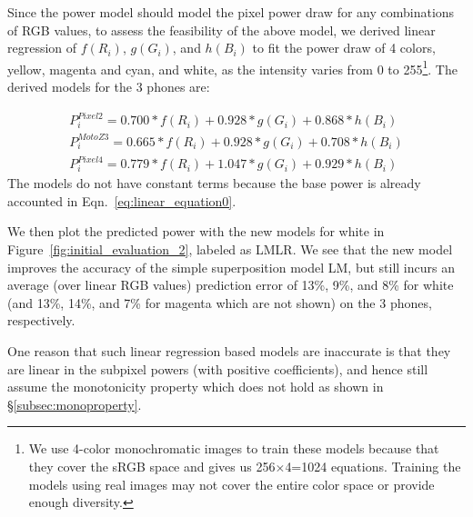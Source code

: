 
Since the power model should model the pixel power draw for
any combinations of RGB values, to assess the feasibility of the above model, we 
derived linear regression of $f(R_{i})$, $g(G_{i})$, and $h(B_{i})$ 
to fit the power draw of 4 colors, yellow, magenta and cyan, and white,
as the intensity varies from 0 to 255\footnote{We use 4-color monochromatic images to train these
  models because that they cover the sRGB space and gives us 256$\times$4=1024 equations.
  Training the models using real images may not cover the entire color space or provide
  enough diversity.}. The derived models
for the 3 phones are:

\vspace{-0.1in}
{\small
  \begin{eqnarray}
	P_i^{Pixel 2} = 0.700*f(R_i) + 0.928*g(G_i) + 0.868*h(B_i) \\
	P_i^{Moto Z3} = 0.665*f(R_i) + 0.928*g(G_i) + 0.708*h(B_i) \\
	P_i^{Pixel 4} = 0.779*f(R_i) + 1.047*g(G_i) + 0.929*h(B_i)
	\label{eq:linear_model_linear_regression}
  \end{eqnarray}
}
\noindent
The models do not have constant terms because the base power is
already accounted in Eqn.~\ref{eq:linear_equation0}.

We then plot the predicted power with the new models for white in
Figure~\ref{fig:initial_evaluation_2}, labeled as LMLR.  We see that the new model
improves the accuracy of the simple superposition model LM, but still
incurs an average (over linear RGB values)
prediction error of 13\%, 9\%, and 8\% for white
(and 13\%, 14\%, and 7\% for magenta which are not shown) on the 3 phones, respectively.

One reason that such linear regression based models are inaccurate
is that they are linear in the subpixel powers (with positive coefficients), and hence still
assume the monotonicity property which does not hold as shown
in \S\ref{subsec:monoproperty}.

